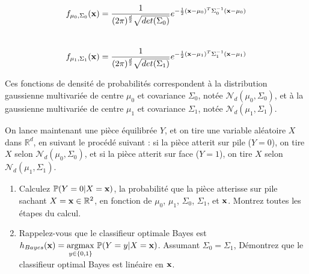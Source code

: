 \documentclass[11pt,french,english]{article}
\begin{document}
\begin{enumerate}
$$f_{\mu_{0},\Sigma_{0}}(\mathbf{x})=\frac{1}{(2\pi)^{\frac{d}{2}}\sqrt{det(\Sigma_{0})}}e^{-\frac{1}{2}(\mathbf{x}-\mu_{0})^{T}\Sigma_{0}^{-1}(\mathbf{x}-\mu_{0})}$$ \\
$$f_{\mu_{1},\Sigma_{1}}(\mathbf{x})=\frac{1}{(2\pi)^{\frac{d}{2}}\sqrt{det(\Sigma_{1})}}e^{-\frac{1}{2}(\mathbf{x}-\mu_{1})^{T}\Sigma_{1}^{-1}(\mathbf{x}-\mu_{1})}$$

{Ces fonctions de densité de probabilités correspondent à la distribution gaussienne multivariée de centre $\mu_0$ et covariance $\Sigma_0$, notée $\mathcal{N}_{d}(\mu_{0},\Sigma_{0})$, et à la gaussienne multivariée de centre $\mu_{1}$ et covariance $\Sigma_{1}$, notée $\mathcal{N}_{d}(\mu_{1},\Sigma_{1})$.}

{On lance maintenant une pièce équilibrée $Y$, et on tire une variable aléatoire $X$ dans $\mathbb{R}^{d}$, en suivant le procédé suivant : si la pièce atterit sur pile ($Y=0$), on tire $X$ selon $\mathcal{N}_{d}(\mu_{0},\Sigma_{0})$, et si la pièce atterit sur face ($Y=1$), on tire $X$ selon $\mathcal{N}_{d}(\mu_{1},\Sigma_{1})$. }

\begin{enumerate}
\item {}
{Calculez $\mathbb{P}(Y=0|X=\mathbf{x})$, la probabilité que la pièce atterisse sur pile sachant $X=\mathbf{x}\in\mathbb{R}^{2}$, en fonction de $\mu_{0}$, $\mu_{1}$, $\Sigma_{0}$, $\Sigma_{1}$, et $\mathbf{x}$.
Montrez toutes les étapes du calcul.}

\item {}%
{Rappelez-vous que le classifieur optimale Bayes est $h_{Bayes}(\mathbf{x}) = \underset{y \in \{0,1\}}{\mathrm{argmax}}\ \mathbb{P}(Y=y|X=\mathbf{x})$. Assumant $\Sigma_0 = \Sigma_1$, Démontrez que le classifieur optimal Bayes est linéaire en $\mathbf{x}$. }
\end{enumerate}


\end{enumerate}
\end{document}
